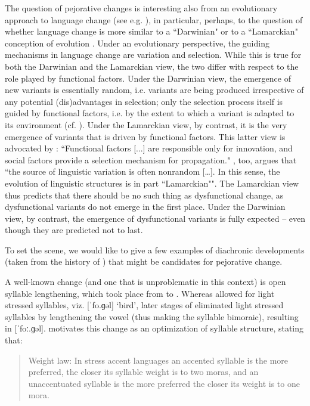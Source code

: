 \documentclass[output=paper,hidelinks]{langscibook}
\begin{document}
The question of pejorative changes is interesting also from an evolutionary approach to language change (see e.g. \citealt{Eckardt_2008}), in particular, perhaps, to the question of whether language change is more similar to a ``Darwinian" or to a ``Lamarckian" conception of evolution \citep{deVogelaer_2007}. Under an evolutionary perspective, the guiding mechanisms in language change are variation and selection. While this is true for both the Darwinian and the Lamarckian view, the two differ with respect to the role played by functional factors. Under the Darwinian view, the emergence of new variants is essentially random, i.e. variants are being produced irrespective of any potential (dis)advantages in selection; only the selection process itself is guided by functional factors, i.e. by the extent to which a variant is adapted to its environment  (cf. \citealt[318]{McMahon_1994}). Under the Lamarckian view, by contrast, it is the very emergence of variants that is driven by functional factors. This latter view is advocated by \citet[38]{Croft_2000}: ``Functional factors [...] are responsible only for innovation, and social factors provide a selection mechanism for propagation." \citet[192--193]{Haspelmath1999optimality}, too, argues that ``the source of linguistic variation is often nonrandom […]. In this sense, the evolution of linguistic structures is in part ``Lamarckian"". The Lamarckian view thus predicts that there should be no such thing as dysfunctional change, as dysfunctional variants do not emerge in the first place. Under the Darwinian view, by contrast, the emergence of dysfunctional variants is fully expected -- even though they are predicted not to last.

To set the scene, we would like to give a few examples of diachronic developments (taken from the history of ) that might be candidates for pejorative change. 

A well-known change (and one that is unproblematic in this context) is open syllable lengthening, which took place from  to  \citep{Lahiri_Dresher_1999}. Whereas  allowed for light stressed syllables, viz. [ˈfo.ɡəl] `bird', later stages of  eliminated light stressed syllables by lengthening the vowel (thus making the syllable bimoraic), resulting in [ˈfoː.ɡəl]. \citet{Vennemann_1988} motivates this change as an optimization of syllable structure, stating that:

\begin{quote}
Weight law: In stress accent languages an accented syllable is the more preferred, the closer its syllable weight is to two moras, and an unaccentuated syllable is the more preferred the closer its weight is to one mora. \citep[30]{Vennemann_1988}
\end{quote}
\end{document}
